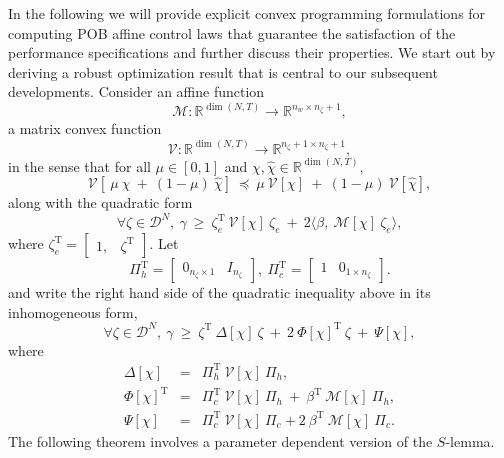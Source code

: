 \documentclass[letterpaper,11pt]{article}
\newcommand{\AR}[2]{\left[\begin{array}{#1}#2\end{array}\right]}
\newcommand{\T}{\mathrm{T}}
\begin{document}
In the following we will provide explicit convex programming formulations for computing POB affine control laws that
guarantee the satisfaction of the performance 
specifications and further discuss their properties. 
We start out by deriving a robust optimization result that is central to our subsequent developments. 
Consider an affine function
$$
\mathcal{M} : \mathbb{R}^{\dim(N,T)}  \rightarrow \mathbb{R}^{n_w \times n_{\zeta}+1},  
$$
a matrix convex function
$$
\mathcal{V} : \mathbb{R}^{\dim(N,T)}  \rightarrow \mathbb{R}^{n_{\zeta}+1 \times n_{\zeta}+1},  
$$
in the sense that for all $ \mu \in [0,1]$ and 
$\chi, \hat{\chi} \in \mathbb{R}^{\dim(N,T)}$,
$$
\mathcal{V}[~ \mu ~  \chi~  + ~ (1-\mu)~  \hat{\chi}]
	~ \preceq ~ \mu ~ \mathcal{V}[\chi]~  +~  (1 - \mu)~ 
\mathcal{V}[\hat{\chi}],	
$$
along with the quadratic form
\begin{equation}
\label{quadratic_inh}
\forall  \zeta \in \mathscr{D}^N,~ \gamma  ~\geq ~
\zeta_e^{\T} ~ \mathcal{V}[\chi]  ~ \zeta_e ~+~ 2 \langle \beta,  ~ 
\mathcal{M}[ \chi]~  \zeta_e \rangle, 
\end{equation}
where 
$\zeta_e^{\T} = \AR{cc}{1 ,& \zeta^{\T} }$.
Let 
$$ 
\Pi_h^\T =  \AR{cc}{ 0_{n_{\zeta} \times 1 } & I_{n_\zeta}},~ \Pi_c^\T = 
\AR{cc}{ 1   &  0_{ 1 \times n_\zeta }}.
$$ 
and write the right hand side of the quadratic inequality above in its inhomogeneous form, 
\begin{equation}
\label{quadratic_actual}
\forall   \zeta   \in  \mathscr{D}^N ,     ~ 
\gamma  ~ \geq ~  \zeta^\T~
\Delta[ \chi]  ~ 
\zeta
~ +~ 2~    \Phi[ \chi]^\T ~
\zeta  ~+~ \Psi[ \chi ],
\end{equation}
where
\begin{eqnarray*}
	\Delta[ \chi ] & = & \Pi_h^\T  ~  \mathcal{V}[\chi]  ~ \Pi_h , \\
	\Phi[ \chi]^{\T}  & = &  \Pi_c^\T ~   \mathcal{V}[\chi] ~ \Pi_h ~+ ~
	\beta^\T ~ \mathcal{M}[ \chi] ~  \Pi_h , \\
	\Psi[ \chi] & = & \Pi_c^\T ~ \mathcal{V}[\chi]  ~ \Pi_c + 2 ~  \beta^\T  ~ \mathcal{M}[ \chi] ~  \Pi_c.
\end{eqnarray*}
The following theorem involves a parameter dependent version of the $S$-lemma. 
\end{document}
